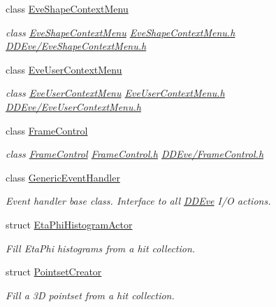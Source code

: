 \begin{DoxyCompactItemize}
class \hyperlink{class_d_d4hep_1_1_eve_shape_context_menu}{EveShapeContextMenu}
\begin{DoxyCompactList}\small\item\em class \hyperlink{class_d_d4hep_1_1_eve_shape_context_menu}{EveShapeContextMenu} \hyperlink{_eve_shape_context_menu_8h}{EveShapeContextMenu.h} \hyperlink{_eve_shape_context_menu_8h}{DDEve/EveShapeContextMenu.h} \item\end{DoxyCompactList}\item 
class \hyperlink{class_d_d4hep_1_1_eve_user_context_menu}{EveUserContextMenu}
\begin{DoxyCompactList}\small\item\em class \hyperlink{class_d_d4hep_1_1_eve_user_context_menu}{EveUserContextMenu} \hyperlink{_eve_user_context_menu_8h}{EveUserContextMenu.h} \hyperlink{_eve_user_context_menu_8h}{DDEve/EveUserContextMenu.h} \item\end{DoxyCompactList}\item 
class \hyperlink{class_d_d4hep_1_1_frame_control}{FrameControl}
\begin{DoxyCompactList}\small\item\em class \hyperlink{class_d_d4hep_1_1_frame_control}{FrameControl} \hyperlink{_frame_control_8h}{FrameControl.h} \hyperlink{_frame_control_8h}{DDEve/FrameControl.h} \item\end{DoxyCompactList}\item 
class \hyperlink{class_d_d4hep_1_1_generic_event_handler}{GenericEventHandler}
\begin{DoxyCompactList}\small\item\em Event handler base class. Interface to all \hyperlink{struct_d_d4hep_1_1_d_d_eve}{DDEve} I/O actions. \item\end{DoxyCompactList}\item 
struct \hyperlink{struct_d_d4hep_1_1_eta_phi_histogram_actor}{EtaPhiHistogramActor}
\begin{DoxyCompactList}\small\item\em Fill EtaPhi histograms from a hit collection. \item\end{DoxyCompactList}\item 
struct \hyperlink{struct_d_d4hep_1_1_pointset_creator}{PointsetCreator}
\begin{DoxyCompactList}\small\item\em Fill a 3D pointset from a hit collection. \item\end{DoxyCompactList}\item 

\end{DoxyCompactItemize}
